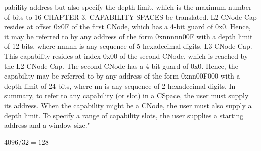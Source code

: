 pability address but also specify the depth limit, which is the maximum number of bits to
16 CHAPTER 3. CAPABILITY SPACES
be translated. L2 CNode Cap resides at offset 0x0F of the first CNode, which has a 4-bit
guard of 0x0. Hence, it may be referred to by any address of the form 0xnnnnn00F with a
depth limit of 12 bits, where nnnnn is any sequence of 5 hexadecimal digits.
L3 CNode Cap. This capability resides at index 0x00 of the second CNode, which is reached by
the L2 CNode Cap. The second CNode has a 4-bit guard of 0x0. Hence, the capability may
be referred to by any address of the form 0xnn00F000 with a depth limit of 24 bits, where
nn is any sequence of 2 hexadecimal digits.
In summary, to refer to any capability (or slot) in a CSpace, the user must supply its address.
When the capability might be a CNode, the user must also supply a depth limit. To specify a
range of capability slots, the user supplies a starting address and a window size.\cite{seL4:2024}" 


$4096 / 32 = 128$


